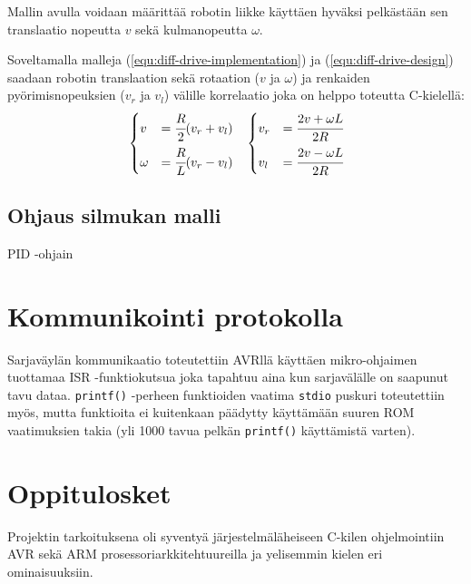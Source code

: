\documentclass[]{article} %
\numberwithin{equation}{section}
\numberwithin{figure}{section}
\numberwithin{table}{section}
\begin{document}
Mallin avulla voidaan määrittää robotin liikke käyttäen hyväksi pelkästään sen translaatio nopeutta $v$ sekä kulmanopeutta $\omega$.

Soveltamalla malleja (\ref{equ:diff-drive-implementation}) ja (\ref{equ:diff-drive-design}) saadaan robotin translaation sekä rotaation ($v$ ja $\omega$) ja renkaiden pyörimisnopeuksien ($v_r$ ja $v_l$) välille korrelaatio joka on helppo toteutta C-kielellä:
\begin{align}
    \label{equ:diff-drive-correlation}
    &
    \begin{dcases}
        v &= \cfrac{R}{2} (v_r + v_l)\\
        \omega &= \cfrac{R}{L} (v_r - v_l)\\
    \end{dcases}
    &
    \begin{dcases}
        v_r &= \cfrac{2v + \omega L}{2R}\\
        v_l &= \cfrac{2v - \omega L}{2R}\\
    \end{dcases}
\end{align}



\subsection{Ohjaus silmukan malli}
\label{sub:Ohjaus silmukan malli}

PID -ohjain


\section{Kommunikointi protokolla}
\label{sec:Kommunikointi protokilla}

Sarjaväylän kommunikaatio toteutettiin AVRllä käyttäen mikro-ohjaimen tuottamaa ISR -funktiokutsua joka tapahtuu aina kun sarjavälälle on saapunut tavu dataa. \verb+printf()+ -perheen funktioiden vaatima \verb+stdio+ puskuri toteutettiin myös, mutta funktioita ei kuitenkaan päädytty käyttämään suuren ROM vaatimuksien takia (yli 1000 tavua pelkän \verb+printf()+ käyttämistä varten). 

\section{Oppitulosket}
\label{sec:Oppitulosket}

Projektin tarkoituksena oli syventyä järjestelmäläheiseen C-kilen ohjelmointiin AVR sekä ARM prosessoriarkkitehtuureilla ja yelisemmin kielen eri ominaisuuksiin.
\end{document}
